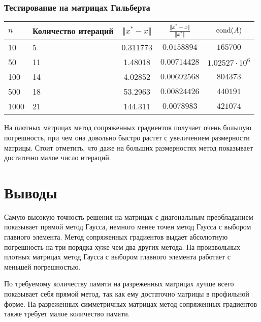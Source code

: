 \documentclass[english]{article}
\begin{document}
\subsubsection{Тестирование на матрицах Гильберта}
\begin{center}
  \begin{longtable}{l|l|c|c|c}
    \(n\) & Количество итераций & \(\Vert x^* - x \Vert\) & \(\frac{\Vert x^* - x \Vert}{\Vert x^* \Vert}\) & \(\mathop{\rm cond}(A) \)\\
    \hline
    10 & 5 & 0.311773 & \(0.0158894\) & \(165700\) \\
    50 & 11 & 1.48018 & \(0.00714428\) & \(1.02527 \cdot 10^{6}\) \\
    100 & 14 & 4.02852 & \(0.00692568\) & \(804373\) \\
    500 & 18 & 53.2963 & \(0.00824426\) & \(440191\) \\
    1000 & 21 & 144.311 & \(0.0078983\) & \(421074\)
  \end{longtable}
\end{center}
На плотных матрицах метод сопряженных градиентов получает очень
большую погрешность, при чем она довольно быстро растет с увеличением
размерности матрицы. Стоит отметить, что даже на больших размерностях
метод показывает достаточно малое число итераций.
\section{Выводы}
Самую высокую точность решения на матрицах с диагональным преобладанием
показывает прямой метод Гаусса, немного менее точен метод Гаусса с
выбором главного элемента. Метод сопряженных градиентов выдает
абсолютную погрешность на три порядка хуже чем два других метода. На
произвольных плотных матрицах метод Гаусса с выбором главного элемента
работает с меньшей погрешностью.

По требуемому количеству памяти на разреженных матрицах лучше всего
показывает себя прямой метод, так как ему достаточно матрицы в
профильной форме. На разреженных симметричных матрицах метод
сопряженных градиентов также требует малое количество памяти.
\end{document}
